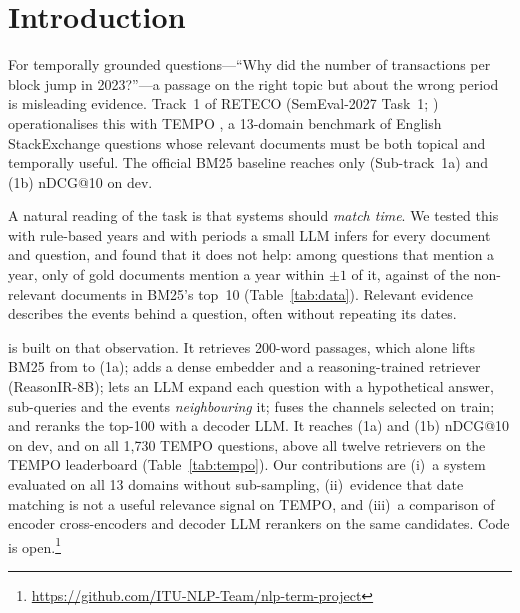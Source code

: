 \section{Introduction}
\label{sec:intro}

For temporally grounded questions---``Why did the number of transactions per block jump in
2023?''---a passage on the right topic but about the wrong period is misleading evidence.
Track~1 of RETECO (SemEval-2027 Task~1; \citealp{reteco2027task}) operationalises this with
TEMPO \citep{abdallah2026tempo}, a 13-domain benchmark of English StackExchange questions whose
relevant documents must be both topical and temporally useful. The official BM25 baseline
reaches only \rOfficialA{} (Sub-track~1a) and \rOfficialB{} (1b) nDCG@10 on dev.

A natural reading of the task is that systems should \emph{match time}. We tested this with
rule-based years and with periods a small LLM infers for every document and question, and found
that it does not help: among questions that mention a year, only \pctGoldOverlap{} of gold
documents mention a year within $\pm1$ of it, against \pctTopOverlap{} of the non-relevant
documents in BM25's top~10 (Table~\ref{tab:data}). Relevant evidence describes the events
behind a question, often without repeating its dates.

\sys is built on that observation. It retrieves 200-word passages, which alone lifts BM25 from
\rOfficialA{} to \rBmA{} (1a); adds a dense embedder and a reasoning-trained retriever
(ReasonIR-8B); lets an LLM expand each question with a hypothetical answer, sub-queries and the
events \emph{neighbouring} it; fuses the channels selected on train; and reranks the top-100
with a decoder LLM. It reaches \rFinalA{} (1a) and \rFinalB{} (1b) nDCG@10 on dev, and
\pooledFinalA{} on all 1{,}730 TEMPO questions, above all twelve retrievers on the TEMPO
leaderboard (Table~\ref{tab:tempo}). Our contributions are (i)~a system evaluated on all 13
domains without sub-sampling, (ii)~evidence that date matching is not a useful relevance signal
on TEMPO, and (iii)~a comparison of encoder cross-encoders and decoder LLM rerankers on the same
candidates. Code is open.\footnote{\url{https://github.com/ITU-NLP-Team/nlp-term-project}}
